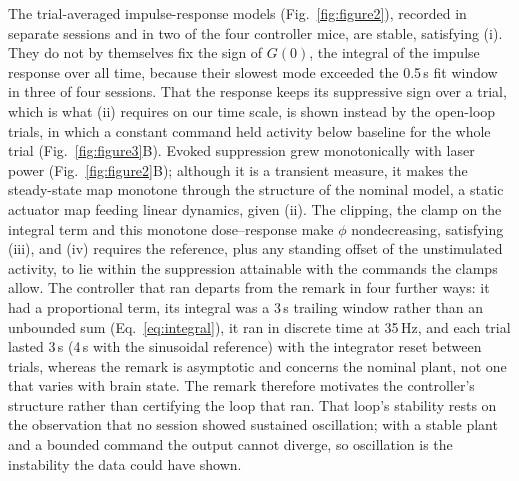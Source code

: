 The trial-averaged impulse-response models (Fig.~\ref{fig:figure2}), recorded in separate sessions and in two of the four controller mice, are stable, satisfying (i). They do not by themselves fix the sign of $G(0)$, the integral of the impulse response over all time, because their slowest mode exceeded the 0.5\,s fit window in three of four sessions. That the response keeps its suppressive sign over a trial, which is what (ii) requires on our time scale, is shown instead by the open-loop trials, in which a constant command held activity below baseline for the whole trial (Fig.~\ref{fig:figure3}B). Evoked suppression grew monotonically with laser power (Fig.~\ref{fig:figure2}B); although it is a transient measure, it makes the steady-state map monotone through the structure of the nominal model, a static actuator map feeding linear dynamics, given (ii). The clipping, the clamp on the integral term and this monotone dose--response make $\phi$ nondecreasing, satisfying (iii), and (iv) requires the reference, plus any standing offset of the unstimulated activity, to lie within the suppression attainable with the commands the clamps allow. The controller that ran departs from the remark in four further ways: it had a proportional term, its integral was a 3\,s trailing window rather than an unbounded sum (Eq.~\eqref{eq:integral}), it ran in discrete time at 35\,Hz, and each trial lasted 3\,s (4\,s with the sinusoidal reference) with the integrator reset between trials, whereas the remark is asymptotic and concerns the nominal plant, not one that varies with brain state. The remark therefore motivates the controller's structure rather than certifying the loop that ran. That loop's stability rests on the observation that no session showed sustained oscillation; with a stable plant and a bounded command the output cannot diverge, so oscillation is the instability the data could have shown.
